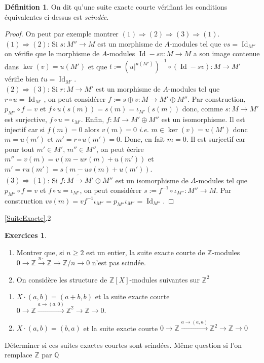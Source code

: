 \documentclass[a4paper, oneside, 12pt]{book}
\theoremstyle{theoremeStyle} %
\theoremstyle{definition} %
\newtheorem{definition}[theoreme]{Définition}
\newtheorem{exercices}[theoreme]{Exercices}
\newcommand{\ie}{\textit{i.e.}} %
\DeclareMathOperator{\Id}{Id}
\newcommand{\Q}{\mathbb{Q}}
\newcommand{\Z}{\mathbb{Z}}
\begin{document}
\begin{definition}On dit qu'une suite exacte courte vérifiant les conditions équivalentes ci-dessus est \textit{scindée}.\end{definition}

 \begin{proof} On peut par exemple montrer $(1)\Rightarrow (2)\Rightarrow (3)\Rightarrow (1)$. \\

  $(1)\Rightarrow (2)$: Si $s:M''\rightarrow M$ est un morphisme de $A$-modules tel que $vs=\Id_{M''}$ on vérifie que le morphisme de $A$-modules $\Id-sv:M\rightarrow M$ a son image contenue dans $\ker(v)=u(M')$ et que  $t:=(u|^{u(M')})^{-1}\circ (\Id-sv):M\rightarrow M'$ vérifie bien $tu=\Id_{M'}$.\\

  $(2)\Rightarrow (3)$: Si $r:M\rightarrow M'$ est un morphisme de $A$-modules tel que $r\circ u=\Id_{M'}$, on peut considérer $f:=s\oplus v:M\rightarrow M'\oplus M''$. Par construction, $p_{M''}\circ f=v$ et $f\circ u(s(m))=s(m)=\iota_{M'}(s(m))$ donc, comme  $s:M\rightarrow M'$ est surjective, $f\circ u=\iota_{M'}$. Enfin, $f:M\rightarrow M'\oplus M''$ est un isomorphisme. Il est injectif car si $f(m)=0$ alors $v(m)=0$ \ie{} $m\in \ker(v)=u(M')$ donc $m=u(m')$ et $m'= r\circ u(m')=0$. Donc, en fait $m=0$. Il est surjectif car pour tout $m'\in M'$, $m''\in M''$, on peut écrire $m''=v(m)=v(m-ur(m)+u(m'))$ et $m'=ru(m')=s(m-us(m)+u(m'))$.\\

 $(3)\Rightarrow (1)$: Si $f:M\tilde{\rightarrow} M'\oplus M''$ est un isomorphisme de $A$-modules tel que $p_{M''}\circ f=v$ et   $f\circ u=\iota_{M'}$, on peut   considérer $s:= f^{-1}\circ \iota_{M''}:M''\rightarrow M $. Par construction $vs(m)=vf^{-1}  \iota_{M''}=p_{M''}\iota_{M''}=\Id_{M''}$.\end{proof}

\ref{SuiteExacte}.2 
\begin{exercices} 
\begin{enumerate} 
\item Montrer que, si $n\geq 2$ est un entier, la suite exacte courte de $\Z$-modules $0\rightarrow \Z\stackrel{n\cdot}{\rightarrow} \Z\rightarrow \Z/n\rightarrow 0$ n'est pas scindée.
\item On considère les structure de   $\Z[X]$-modules  suivantes sur $\Z^2$
\end{enumerate}

\begin{enumerate}
\item $X\cdot (a,b)=(a+b,b)$ et la suite exacte courte $0\rightarrow \Z\stackrel{a\rightarrow (a,0)}{\rightarrow} \Z^2\rightarrow \Z\rightarrow 0.$
\item $X\cdot (a,b)=(b,a)$ et la suite exacte courte $0\rightarrow \Z\stackrel{a\rightarrow (a,a)}{\rightarrow} \Z^2\rightarrow \Z\rightarrow 0$
\end{enumerate}

Déterminer si ces suites exactes courtes sont scindées. Même question si l'on remplace $\Z$ par $\Q$

\end{exercices}
\end{document}
